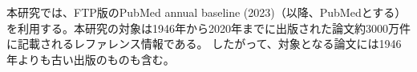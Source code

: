 本研究では、FTP版のPubMed annual baseline (2023)（以降、PubMedとする）\cite{PM1}を利用する。本研究の対象は1946年から2020年までに出版された論文約3000万件に記載されるレファレンス情報である。
したがって、対象となる論文には1946年よりも古い出版のものも含む。
